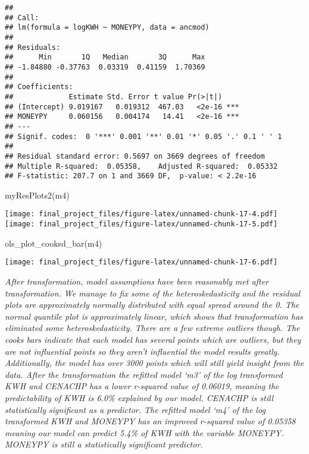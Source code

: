\documentclass[
]{article}
\newenvironment{Shaded}{\begin{snugshade}}{\end{snugshade}}
\newcommand{\FunctionTok}[1]{\textcolor[rgb]{0.00,0.00,0.00}{#1}}
\newcommand{\NormalTok}[1]{#1}
\begin{document}
\begin{verbatim}
## 
## Call:
## lm(formula = logKWH ~ MONEYPY, data = ancmod)
## 
## Residuals:
##      Min       1Q   Median       3Q      Max 
## -1.84880 -0.37763  0.03319  0.41159  1.70369 
## 
## Coefficients:
##             Estimate Std. Error t value Pr(>|t|)    
## (Intercept) 9.019167   0.019312  467.03   <2e-16 ***
## MONEYPY     0.060156   0.004174   14.41   <2e-16 ***
## ---
## Signif. codes:  0 '***' 0.001 '**' 0.01 '*' 0.05 '.' 0.1 ' ' 1
## 
## Residual standard error: 0.5697 on 3669 degrees of freedom
## Multiple R-squared:  0.05358,    Adjusted R-squared:  0.05332 
## F-statistic: 207.7 on 1 and 3669 DF,  p-value: < 2.2e-16
\end{verbatim}

\begin{Shaded}
\begin{Highlighting}[]
\FunctionTok{myResPlots2}\NormalTok{(m4)}
\end{Highlighting}
\end{Shaded}

\texttt{[image: final\_project\_files/figure-latex/unnamed-chunk-17-4.pdf]}
\texttt{[image: final\_project\_files/figure-latex/unnamed-chunk-17-5.pdf]}

\begin{Shaded}
\begin{Highlighting}[]
\FunctionTok{ols\_plot\_cooksd\_bar}\NormalTok{(m4)}
\end{Highlighting}
\end{Shaded}

\texttt{[image: final\_project\_files/figure-latex/unnamed-chunk-17-6.pdf]}

\emph{After transformation, model assumptions have been reasonably met
after transformation. We manage to fix some of the heteroskedasticity
and the residual plots are approximately normally distributed with equal
spread around the 0. The normal quantile plot is approximately linear,
which shows that transformation has eliminated some heteroskedasticity.
There are a few extreme outliers though. The cooks bars indicate that
each model has several points which are outliers, but they are not
influential points so they aren't influential the model results greatly.
Additionally, the model has over 3000 points which will still yield
insight from the data. After the transformation the refitted model `m3'
of the log transformed KWH and CENACHP has a lower r-squared value of
0.06019, meaning the predictability of KWH is 6.0\% explained by our
model. CENACHP is still statistically significant as a predictor. The
refitted model `m4' of the log transformed KWH and MONEYPY has an
improved r-squared value of 0.05358 meaning our model can predict 5.4\%
of KWH with the variable MONEYPY. MONEYPY is still a statistically
significant predictor. }
\end{document}
